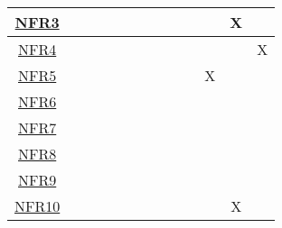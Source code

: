 \documentclass[12pt, titlepage]{article}
\begin{document}
\begin{table}[H]
\begin{tabular}{|c|cccccccccccc|}
\hyperref[NFR3]{NFR3} & \multicolumn{1}{c|}{}  & \multicolumn{1}{c|}{}  & \multicolumn{1}{c|}{}
& \multicolumn{1}{c|}{}  & \multicolumn{1}{c|}{}  & \multicolumn{1}{c|}{}
& \multicolumn{1}{c|}{}  & \multicolumn{1}{c|}{}  & \multicolumn{1}{c|}{}
& \multicolumn{1}{c|}{}   & \multicolumn{1}{c|}{X}   &    \\ \hline

\hyperref[NFR4]{NFR4} & \multicolumn{1}{c|}{}  & \multicolumn{1}{c|}{}  & \multicolumn{1}{c|}{}
& \multicolumn{1}{c|}{}  & \multicolumn{1}{c|}{}  & \multicolumn{1}{c|}{}
& \multicolumn{1}{c|}{}  & \multicolumn{1}{c|}{}  & \multicolumn{1}{c|}{}
& \multicolumn{1}{c|}{}   & \multicolumn{1}{c|}{}   &  X  \\ \hline

\hyperref[NFR5]{NFR5} & \multicolumn{1}{c|}{}  & \multicolumn{1}{c|}{}  & \multicolumn{1}{c|}{}
& \multicolumn{1}{c|}{}  & \multicolumn{1}{c|}{}  & \multicolumn{1}{c|}{}
& \multicolumn{1}{c|}{}  & \multicolumn{1}{c|}{}  & \multicolumn{1}{c|}{}
& \multicolumn{1}{c|}{X}   & \multicolumn{1}{c|}{}   &    \\ \hline

\hyperref[NFR6]{NFR6} & \multicolumn{1}{c|}{}  & \multicolumn{1}{c|}{}  & \multicolumn{1}{c|}{}
& \multicolumn{1}{c|}{}  & \multicolumn{1}{c|}{}  & \multicolumn{1}{c|}{}
& \multicolumn{1}{c|}{}  & \multicolumn{1}{c|}{}  & \multicolumn{1}{c|}{}
& \multicolumn{1}{c|}{}   & \multicolumn{1}{c|}{}   &    \\ \hline

\hyperref[NFR7]{NFR7} & \multicolumn{1}{c|}{}  & \multicolumn{1}{c|}{}  & \multicolumn{1}{c|}{}
& \multicolumn{1}{c|}{}  & \multicolumn{1}{c|}{}  & \multicolumn{1}{c|}{}
& \multicolumn{1}{c|}{}  & \multicolumn{1}{c|}{}  & \multicolumn{1}{c|}{}
& \multicolumn{1}{c|}{}   & \multicolumn{1}{c|}{}   &    \\ \hline

\hyperref[NFR8]{NFR8} & \multicolumn{1}{c|}{}  & \multicolumn{1}{c|}{}  & \multicolumn{1}{c|}{}
& \multicolumn{1}{c|}{}  & \multicolumn{1}{c|}{}  & \multicolumn{1}{c|}{}
& \multicolumn{1}{c|}{}  & \multicolumn{1}{c|}{}  & \multicolumn{1}{c|}{}
& \multicolumn{1}{c|}{}   & \multicolumn{1}{c|}{}   &    \\ \hline

\hyperref[NFR9]{NFR9} & \multicolumn{1}{c|}{}  & \multicolumn{1}{c|}{}  & \multicolumn{1}{c|}{}
& \multicolumn{1}{c|}{}  & \multicolumn{1}{c|}{}  & \multicolumn{1}{c|}{}
& \multicolumn{1}{c|}{}  & \multicolumn{1}{c|}{}  & \multicolumn{1}{c|}{}
& \multicolumn{1}{c|}{}   & \multicolumn{1}{c|}{}   &    \\ \hline

\hyperref[NFR10]{NFR10} & \multicolumn{1}{c|}{}  & \multicolumn{1}{c|}{}  & \multicolumn{1}{c|}{}
& \multicolumn{1}{c|}{}  & \multicolumn{1}{c|}{}  & \multicolumn{1}{c|}{}
& \multicolumn{1}{c|}{}  & \multicolumn{1}{c|}{}  & \multicolumn{1}{c|}{}
& \multicolumn{1}{c|}{}   & \multicolumn{1}{c|}{X}   &    \\ \hline
    \end{tabular}
    \label{tab:traceability}
\end{table}
\end{document}
